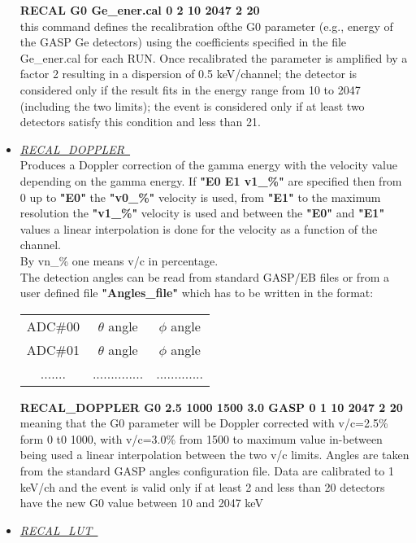 \begin{itemize}
	\hskip1cm {\bf RECAL G0 Ge\_ener.cal 0 2 10 2047 2 20}\\
	this command defines the recalibration ofthe G0 parameter (e.g., 
	energy of the GASP Ge detectors) using the coefficients specified in 
	the file Ge\_ener.cal for each RUN. Once recalibrated the 
	parameter is amplified by a factor 2 resulting in a 
	dispersion of 0.5 keV/channel; the detector is considered 
	only if the result fits in the energy range from 10 to 2047
	(including the two limits); the event is considered only if 
	at least two detectors satisfy this condition and less than 
	21.
		  
 \item	{\it\underline{RECAL\_DOPPLER~}}\footnotemark[2] \\

	Produces a Doppler correction of the gamma energy with the velocity
	value depending on the gamma energy. If {\bf "E0 E1 v1\_\%"} are
	specified then from 0 up to {\bf "E0"} the {\bf "v0\_\%"} velocity is 
	used, from {\bf "E1"} to the maximum resolution the {\bf "v1\_\%"} 
	velocity is used and between the {\bf "E0"} and {\bf "E1"} values a 
	linear interpolation is done for the velocity as a function of the 
	channel.\\
	By vn\_\% one means v/c in percentage.\\
	The detection angles can be read from standard GASP/EB files or from a
	user defined file {\bf "Angles\_file"} which has to be written in the 
	format:
\begin{center}
\begin{tabular}{ccc}
ADC\#00	& $\theta$ angle & $\phi$ angle \\
ADC\#01	& $\theta$ angle & $\phi$ angle \\
....... & .............. & .............
\end{tabular}
\end{center}

	\hskip1cm{\bf RECAL\_DOPPLER G0 2.5 1000 1500 3.0 GASP 0 1 10 2047 
	2 20}\\ 
	meaning that the G0 parameter will be Doppler corrected with v/c=2.5\%
	form 0 t0 1000, with v/c=3.0\% from 1500 to maximum value in-between
	being used a linear interpolation between the two v/c limits. Angles
	are taken from the standard GASP angles configuration file. Data are 
	calibrated to 1 keV/ch and the event is valid  only if at least 2 and 
	less than 20 detectors have the new G0 value between 10 and 2047 keV 

 \item	{\it\underline{RECAL\_LUT~}}\footnotemark[2] \\


\end{itemize}
